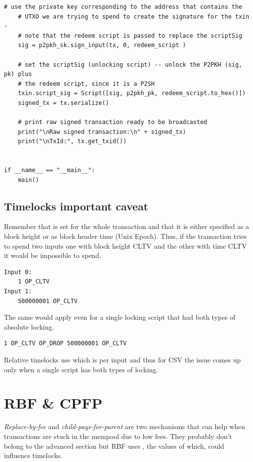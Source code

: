 \begin{lstlisting}[style=Python]
    # use the private key corresponding to the address that contains the
    # UTXO we are trying to spend to create the signature for the txin -
    # note that the redeem script is passed to replace the scriptSig
    sig = p2pkh_sk.sign_input(tx, 0, redeem_script )

    # set the scriptSig (unlocking script) -- unlock the P2PKH (sig, pk) plus
    # the redeem script, since it is a P2SH
    txin.script_sig = Script([sig, p2pkh_pk, redeem_script.to_hex()])
    signed_tx = tx.serialize()

    # print raw signed transaction ready to be broadcasted
    print("\nRaw signed transaction:\n" + signed_tx)
    print("\nTxId:", tx.get_txid())


if __name__ == "__main__":
    main()
\end{lstlisting}
\vspace{1em}


\subsection*{Timelocks important caveat}
\label{ssec:timelocks-important-caveat}
Remember that  is set for the whole transaction and that it is either specified as a block height or as block header time (Unix Epoch). Thus, if the transaction tries to spend two inputs one with block height CLTV and the other with time CLTV it would be impossible to spend. 
\begin{emphbox}
\begin{lstlisting}[style=Pseudomath]
Input 0:
	1 OP_CLTV
Input 1:
	500000001 OP_CLTV
\end{lstlisting}
\end{emphbox}

The same would apply even for a single locking script that had both types of absolute locking.

\begin{emphbox}
\begin{lstlisting}[style=Pseudomath]
1 OP_CLTV OP_DROP 500000001 OP_CLTV
\end{lstlisting}
\end{emphbox}

Relative timelocks use  which is per input and thus for CSV the issue comes up only when a single script has both types of locking.



\section{RBF \& CPFP}
\emph{Replace-by-fee} and \emph{child-pays-for-parent} are two mechanisms that can help when transactions are stuck in the mempool due to low fees. They probably don't belong to the advanced section but RBF uses , the values of which, could influence timelocks. 

